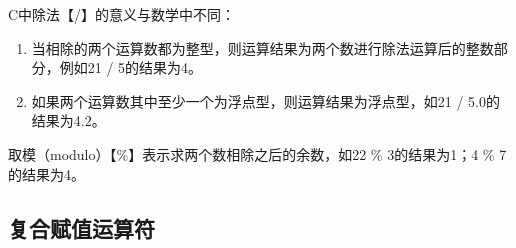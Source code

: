 \begin{table}[H]
	\centering
	\caption{四则运算}
\end{table}

C中除法【/】的意义与数学中不同：

\begin{enumerate}
	\item 当相除的两个运算数都为整型，则运算结果为两个数进行除法运算后的整数部分，例如21 / 5的结果为4。

	\item 如果两个运算数其中至少一个为浮点型，则运算结果为浮点型，如21 / 5.0的结果为4.2。
\end{enumerate}

取模（modulo）【\%】表示求两个数相除之后的余数，如22 \% 3的结果为1；4 \% 7的结果为4。\\

\subsection{复合赋值运算符}

\begin{table}[H]
	\centering
	\caption{复合赋值运算符}
\end{table}

